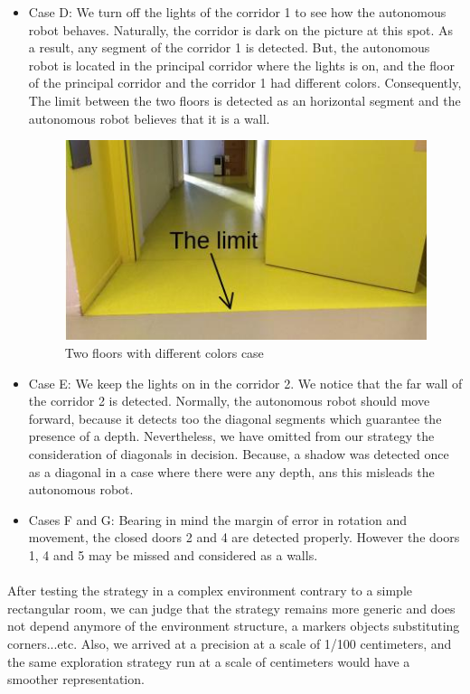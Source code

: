 \documentclass[12pt]{report}
\begin{document}
\begin{itemize}
		\item Case D: We turn off the lights of the corridor 1 to see how the autonomous robot behaves. Naturally, the corridor is dark on the picture at this spot. As a result, any segment of the corridor 1 is detected. But, the autonomous robot is located in the principal corridor where the lights is on, and the floor of the principal corridor and the corridor 1 had different colors. Consequently, The limit between the two floors is detected as an horizontal segment and the autonomous robot believes that it is a wall.
		\begin{figure}[H]
			\begin{center}
				\includegraphics[scale=0.80]{res/limit_cor.jpg}
				\caption{Two floors with different colors case}
			\end{center}
		\end{figure}
	\item Case E: We keep the lights on in the corridor 2. We notice that the far wall of the corridor 2 is detected. Normally, the autonomous robot should move forward, because it detects too the diagonal segments which guarantee the presence of a depth. Nevertheless, we have omitted from our strategy the consideration of diagonals in decision. Because, a shadow was detected once as a diagonal in a case where there were any depth, ans this misleads the autonomous robot.
	
	\item Cases F and G: Bearing in mind the margin of error in rotation and movement, the closed doors 2 and 4 are detected properly. However the doors 1, 4 and 5 may be missed and considered as a walls.
	\end{itemize}

	\paragraph{}
	After testing the strategy in a complex environment contrary to a simple rectangular room, we can judge that the strategy remains more generic and does not depend anymore of the environment structure, a markers objects substituting corners...etc. Also, we arrived at a precision at a scale of 1/100 centimeters, and the same exploration strategy run at a scale of centimeters would have a smoother representation.
\end{document}
